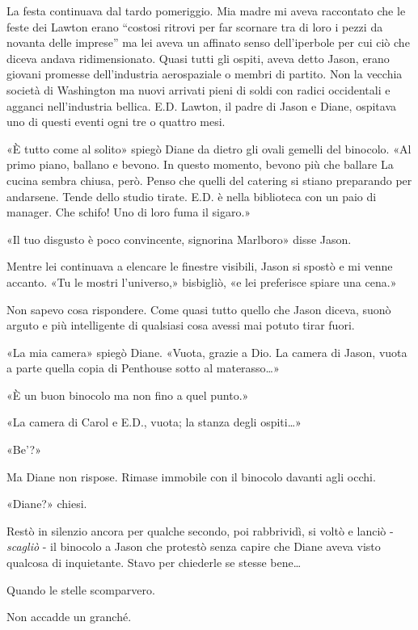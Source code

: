 La festa continuava dal tardo pomeriggio. Mia madre mi aveva raccontato
che le feste dei Lawton erano ``costosi ritrovi per far scornare tra di
loro i pezzi da novanta delle imprese'' ma lei aveva un affinato senso
dell'iperbole per cui ciò che diceva andava ridimensionato. Quasi tutti
gli ospiti, aveva detto Jason, erano giovani promesse dell'industria
aerospaziale o membri di partito. Non la vecchia società di Washington
ma nuovi arrivati pieni di soldi con radici occidentali e agganci
nell'industria bellica. E.D. Lawton, il padre di Jason e Diane, ospitava
uno di questi eventi ogni tre o quattro mesi.

«È tutto come al solito» spiegò Diane da dietro gli ovali gemelli del
binocolo. «Al primo piano, ballano e bevono. In questo momento, bevono
più che ballare La cucina sembra chiusa, però. Penso che quelli del
catering si stiano preparando per andarsene. Tende dello studio tirate.
E.D. è nella biblioteca con un paio di manager. Che schifo! Uno di loro
fuma il sigaro.»

«Il tuo disgusto è poco convincente, signorina Marlboro» disse Jason.

Mentre lei continuava a elencare le finestre visibili, Jason si spostò e
mi venne accanto. «Tu le mostri l'universo,» bisbigliò, «e lei
preferisce spiare una cena.»

Non sapevo cosa rispondere. Come quasi tutto quello che Jason diceva,
suonò arguto e più intelligente di qualsiasi cosa avessi mai potuto
tirar fuori.

«La mia camera» spiegò Diane. «Vuota, grazie a Dio. La camera di Jason,
vuota a parte quella copia di Penthouse sotto al materasso\ldots»

«È un buon binocolo ma non fino a quel punto.»

«La camera di Carol e E.D., vuota; la stanza degli ospiti\ldots»

«Be'?»

Ma Diane non rispose. Rimase immobile con il binocolo davanti agli
occhi.

«Diane?» chiesi.

Restò in silenzio ancora per qualche secondo, poi rabbrividì, si voltò e
lanciò - \emph{scagliò} - il binocolo a Jason che protestò senza capire
che Diane aveva visto qualcosa di inquietante. Stavo per chiederle se
stesse bene\ldots{}

Quando le stelle scomparvero.

\separatorefiori

Non accadde un granché.

